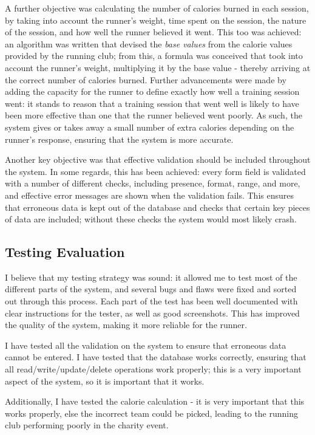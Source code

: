 \documentclass{article}[12pt,a4paper]
\begin{document}
{A further objective was calculating the number of calories burned in each session, by taking into account the runner’s weight, time spent on the session, the nature of the session, and how well the runner believed it went. This too was achieved: an algorithm was written that devised the \textit{base values} from the calorie values provided by the running club; from this, a formula was conceived that took into account the runner's weight, multiplying it by the base value - thereby arriving at the correct number of calories burned. Further advancements were made by adding the capacity for the runner to define exactly how well a training session went: it stands to reason that a training session that went well is likely to have been more effective than one that the runner believed went poorly. As such, the system gives or takes away a small number of extra calories depending on the runner's response, ensuring that the system is more accurate.

Another key objective was that effective validation should be included throughout the system. In some regards, this has been achieved: every form field is validated with a number of different checks, including presence, format, range, and more, and effective error messages are shown when the validation fails. This ensures that erroneous data is kept out of the database and checks that certain key pieces of data are included; without these checks the system would most likely crash. 


\subsection{Testing Evaluation}
I believe that my testing strategy was sound: it allowed me to test most of the different parts of the system, and several bugs and flaws were fixed and sorted out through this process. Each part of the test has been well documented with clear instructions for the tester, as well as good screenshots. This has improved the quality of the system, making it more reliable for the runner.

I have tested all the validation on the system to ensure that erroneous data cannot be entered. I have tested that the database works correctly, ensuring that all read/write/update/delete operations work properly; this is a very important aspect of the system, so it is important that it works.

Additionally, I have tested the calorie calculation - it is very important that this works properly, else the incorrect team could be picked, leading to the running club performing poorly in the charity event.

}
\end{document}
